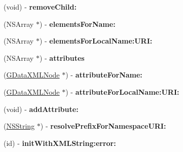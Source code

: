 \begin{DoxyCompactItemize}
\item 
\hypertarget{interface_g_data_x_m_l_element_a8d9571efd0923ecc365b267fd1c95c8a}{
(void) -\/ {\bfseries removeChild:}}
\label{interface_g_data_x_m_l_element_a8d9571efd0923ecc365b267fd1c95c8a}

\item 
\hypertarget{interface_g_data_x_m_l_element_af0724908d7e1c6b831caddcaf7973aaa}{
(NSArray $\ast$) -\/ {\bfseries elementsForName:}}
\label{interface_g_data_x_m_l_element_af0724908d7e1c6b831caddcaf7973aaa}

\item 
\hypertarget{interface_g_data_x_m_l_element_af2cb81abe782d2d3396fe9abe3b9f60e}{
(NSArray $\ast$) -\/ {\bfseries elementsForLocalName:URI:}}
\label{interface_g_data_x_m_l_element_af2cb81abe782d2d3396fe9abe3b9f60e}

\item 
\hypertarget{interface_g_data_x_m_l_element_ae6e3e03eff00c20c2953fcbe88d3c4d5}{
(NSArray $\ast$) -\/ {\bfseries attributes}}
\label{interface_g_data_x_m_l_element_ae6e3e03eff00c20c2953fcbe88d3c4d5}

\item 
\hypertarget{interface_g_data_x_m_l_element_a0823c7ce613abf40d5913805cbf54a8e}{
(\hyperlink{interface_g_data_x_m_l_node}{GDataXMLNode} $\ast$) -\/ {\bfseries attributeForName:}}
\label{interface_g_data_x_m_l_element_a0823c7ce613abf40d5913805cbf54a8e}

\item 
\hypertarget{interface_g_data_x_m_l_element_aa685fc8bb2453aa2af8543eaa3ac27bc}{
(\hyperlink{interface_g_data_x_m_l_node}{GDataXMLNode} $\ast$) -\/ {\bfseries attributeForLocalName:URI:}}
\label{interface_g_data_x_m_l_element_aa685fc8bb2453aa2af8543eaa3ac27bc}

\item 
\hypertarget{interface_g_data_x_m_l_element_a51a2307fd7086c0e814fd7b3d5da86bf}{
(void) -\/ {\bfseries addAttribute:}}
\label{interface_g_data_x_m_l_element_a51a2307fd7086c0e814fd7b3d5da86bf}

\item 
\hypertarget{interface_g_data_x_m_l_element_ab27be508b932cbe3d0686659069e41b7}{
(\hyperlink{class_n_s_string}{NSString} $\ast$) -\/ {\bfseries resolvePrefixForNamespaceURI:}}
\label{interface_g_data_x_m_l_element_ab27be508b932cbe3d0686659069e41b7}

\item 
\hypertarget{interface_g_data_x_m_l_element_a8020a4dae6ad3175527534d5a793e285}{
(id) -\/ {\bfseries initWithXMLString:error:}}
\label{interface_g_data_x_m_l_element_a8020a4dae6ad3175527534d5a793e285}


\end{DoxyCompactItemize}

